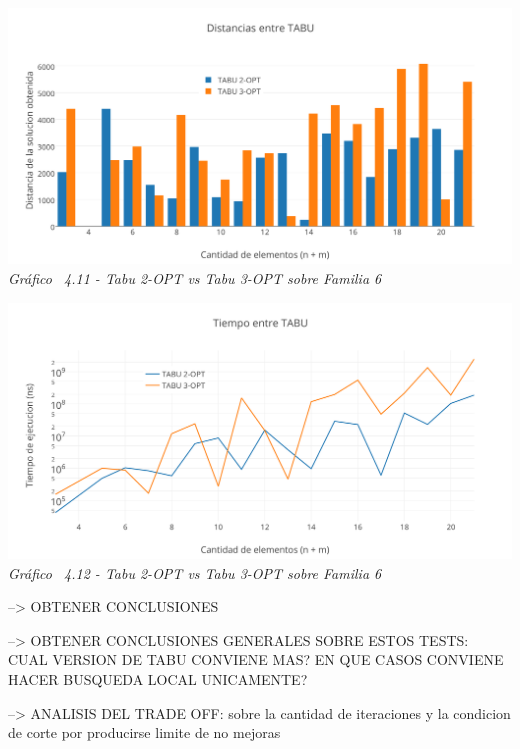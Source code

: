 \vspace*{0.3cm} \vspace*{0.3cm}
  \begin{center}
 \includegraphics[scale=0.5]{./EJ4/comparativorandom.png}\\
 {            \textit{Gráfico \ 4.11 - Tabu 2-OPT vs Tabu 3-OPT sobre Familia 6}}
  \end{center}
  \vspace*{0.3cm}

\vspace*{0.3cm} \vspace*{0.3cm}
  \begin{center}
 \includegraphics[scale=0.5]{./EJ4/medicionrandom.png}\\
 {            \textit{Gráfico \ 4.12 - Tabu 2-OPT vs Tabu 3-OPT sobre Familia 6}}
  \end{center}
  \vspace*{0.3cm}
  
--> OBTENER CONCLUSIONES

--> OBTENER CONCLUSIONES GENERALES SOBRE ESTOS TESTS: CUAL VERSION DE TABU CONVIENE MAS? EN QUE CASOS CONVIENE HACER BUSQUEDA LOCAL UNICAMENTE?  
  
--> ANALISIS DEL TRADE OFF: sobre la cantidad de iteraciones y la condicion de corte por producirse limite de no mejoras


